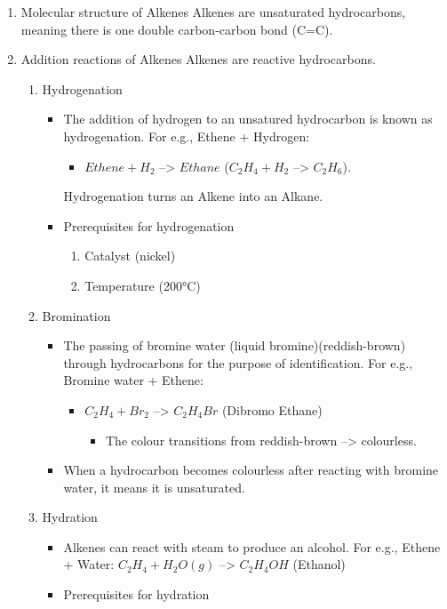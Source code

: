\documentclass[11pt]{article}
\begin{document}
\begin{enumerate}
\item Molecular structure of Alkenes
\label{sec:orgdcbc64b}
Alkenes are unsaturated hydrocarbons, meaning there is one double carbon-carbon bond (C=C).
\item Addition reactions of Alkenes
\label{sec:org26216fc}
Alkenes are reactive hydrocarbons.
\begin{enumerate}
\item Hydrogenation
\begin{itemize}
\item The addition of hydrogen to an unsatured hydrocarbon is known as hydrogenation. For e.g., Ethene + Hydrogen:
\begin{itemize}
\item \(Ethene + H_2\) --> \(Ethane\) (\(C_2H_4 + H_2\) --> \(C_2H_6\)).
\end{itemize}
Hydrogenation turns an Alkene into an Alkane.
\item Prerequisites for hydrogenation
\begin{enumerate}
\item Catalyst (nickel)
\item Temperature (200°C)
\end{enumerate}
\end{itemize}
\item Bromination
\begin{itemize}
\item The passing of bromine water (liquid bromine)(reddish-brown) through hydrocarbons for the purpose of identification. For e.g., Bromine water + Ethene:
\begin{itemize}
\item \(C_2H_4 + Br_2\) --> \(C_2H_4Br\) (Dibromo Ethane)
\begin{itemize}
\item The colour transitions from reddish-brown --> colourless.
\end{itemize}
\end{itemize}
\item When a hydrocarbon becomes colourless after reacting with bromine water, it means it is unsaturated.
\end{itemize}
\item Hydration
\begin{itemize}
\item Alkenes can react with steam to produce an alcohol. For e.g., Ethene + Water: \(C_2H_4 + H_2O (g)\) --> \(C_2H_4OH\) (Ethanol)
\item Prerequisites for hydration

\end{itemize}
\end{enumerate}
\end{enumerate}
\end{document}

